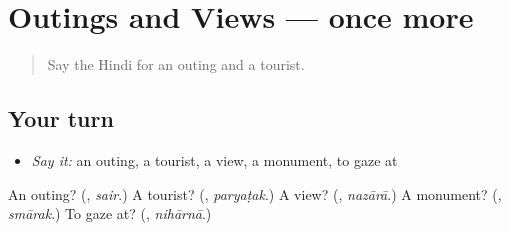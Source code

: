 \section[(dialogue)]{Outings and Views — once more}

\label{lesson:HI-R451-review-final-451}



\begin{quote}
Say the Hindi for an outing and a tourist.
\end{quote}

\subsection*{Your turn}
\begin{itemize}
\raggedright
  \item \emph{Say it:} an outing, a tourist, a view, a monument, to gaze at
\end{itemize}

\begin{tcolorbox}[breakable,colback=teal!4,colframe=teal!35!black,title={Before you move on}]
An outing? (\textbf{}, \emph{sair}.) A tourist? (\textbf{}, \emph{paryaṭak}.) A view? (\textbf{}, \emph{nazārā}.) A monument? (\textbf{}, \emph{smārak}.) To gaze at? (\textbf{}, \emph{nihārnā}.)
\end{tcolorbox}
